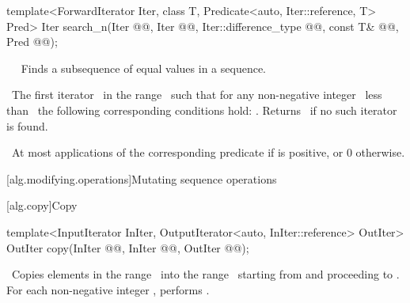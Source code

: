 \documentclass[american,twoside]{book}
\begin{document}
\begin{paras}
\begin{itemdecl}
template<ForwardIterator Iter, class T,
         Predicate<auto, Iter::reference, T> Pred>
  Iter search_n(Iter @@, Iter @@, Iter::difference_type @@,
                const T& @@, Pred @@);
\end{itemdecl}\color{black}

\begin{itemdescr}
\pnum
{} 


\pnum\ \color{black}
\effects\ 
Finds a subsequence of equal values in a sequence.

\pnum
\returns\ 
The first iterator
\
in the range \
such that for any non-negative integer
\tcode{n}\
less than
\
the following corresponding conditions hold:
.
Returns \farg{last}\
if no such iterator is found.

\pnum
\textcolor{black}{}\complexity\ 
At most
applications of the corresponding predicate if \farg{count} is positive, or
0 otherwise.
\end{itemdescr}

\rSec1[alg.modifying.operations]{Mutating sequence operations}

\rSec2[alg.copy]{Copy}

\index{copy@\tcode{copy}}%
\color{addclr}\begin{itemdecl}
template<InputIterator InIter, OutputIterator<auto, InIter::reference> OutIter>
  OutIter copy(InIter @@, InIter @@,
               OutIter @\farg{result}@);
\end{itemdecl}\color{black}

\begin{itemdescr}
\pnum
\effects\ 
Copies elements in the range \
into the range \
starting from  and proceeding to .
For each non-negative integer
\tcode{n < (\farg{last}-\farg{first})},
performs
.


\end{itemdescr}
\end{paras}
\end{document}
